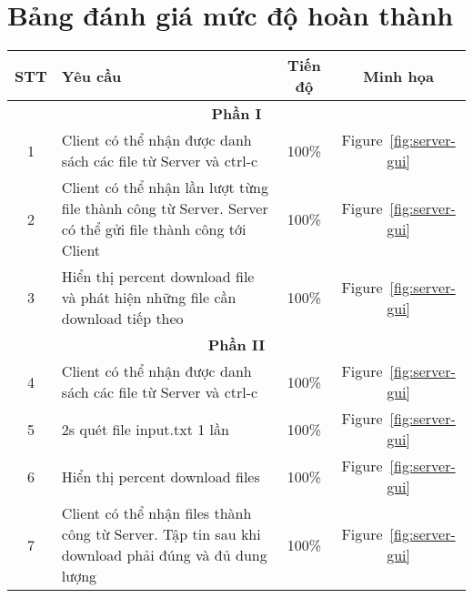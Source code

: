 \documentclass[a4paper,12pt]{report}
\begin{document}
\section{Bảng đánh giá mức độ hoàn thành}
\begin{center}
  \renewcommand{\arraystretch}{1.5}
  \begin{tabular}{|c|p{}|c|c|}
    \hline
    \textbf{STT} & \textbf{Yêu cầu}                                                                                         & \textbf{Tiến độ} & \textbf{Minh họa}           \\\hline
    \multicolumn{4}{|c|}{\textbf{Phần I}}                                                                                                                                    \\\hline
    1            & Client có thể nhận được danh sách các file từ Server và ctrl-c                                           & 100\%            & Figure~\ref{fig:server-gui} \\\hline
    2            & Client có thể nhận lần lượt từng file thành công từ Server. Server có thể gửi file thành công tới Client & 100\%            & Figure~\ref{fig:server-gui} \\\hline
    3            & Hiển thị percent download file và phát hiện những file cần download tiếp theo                            & 100\%            & Figure~\ref{fig:server-gui} \\\hline
    \multicolumn{4}{|c|}{\textbf{Phần II}}                                                                                                                                   \\\hline
    4            & Client có thể nhận được danh sách các file từ Server và ctrl-c                                           & 100\%            & Figure~\ref{fig:server-gui} \\\hline
    5            & 2s quét file input.txt 1 lần                                                                             & 100\%            & Figure~\ref{fig:server-gui} \\\hline
    6            & Hiển thị percent download files                                                                          & 100\%            & Figure~\ref{fig:server-gui} \\\hline
    7            & Client có thể nhận files thành công từ Server. Tập tin sau khi download phải đúng và đủ dung lượng       & 100\%            & Figure~\ref{fig:server-gui} \\\hline

\end{tabular}
\end{center}
\end{document}
